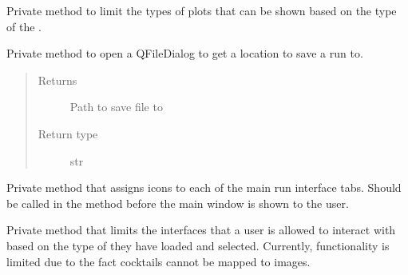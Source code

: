 \documentclass[letterpaper,10pt,english]{sphinxmanual}
\begin{document}
\begin{fulllineitems}
\begin{fulllineitems}
\label{\detokenize{polo.windows:polo.windows.main_window.MainWindow._plot_limiter}}
Private method to limit the types of plots that can be shown
based on the type of the .

\end{fulllineitems}


\begin{fulllineitems}
\label{\detokenize{polo.windows:polo.windows.main_window.MainWindow._save_file_dialog}}
Private method to open a QFileDialog to get a location
to save a run to.
\begin{quote}\begin{description}
\item[{Returns}] \leavevmode
Path to save file to

\item[{Return type}] \leavevmode
str

\end{description}\end{quote}

\end{fulllineitems}


\begin{fulllineitems}
\label{\detokenize{polo.windows:polo.windows.main_window.MainWindow._set_tab_icons}}
Private method that assigns icons to each of the main run 
interface tabs. Should be called in the  method before
the main window is shown to the user.

\end{fulllineitems}


\begin{fulllineitems}
\label{\detokenize{polo.windows:polo.windows.main_window.MainWindow._tab_limiter}}
Private method that limits the interfaces that a user is allowed
to interact with based on the type of  they have loaded and
selected. Currently,  functionality is limited due to the fact
cocktails cannot be mapped to images.


\end{fulllineitems}
\end{fulllineitems}
\end{document}
